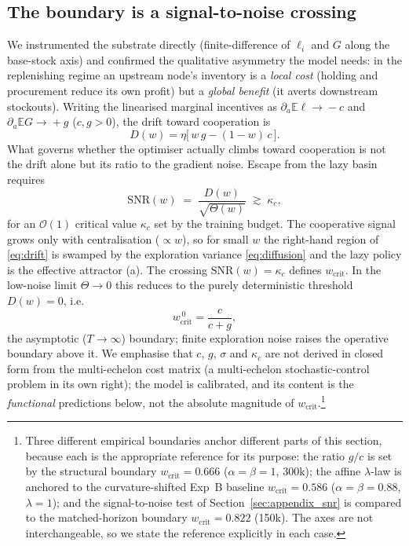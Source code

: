 \documentclass[letterpaper]{article}
\theoremstyle{plain}
\newcommand{\wcrit}{w_{\mathrm{crit}}}
\begin{document}
\subsection{The boundary is a signal-to-noise crossing}
We instrumented the substrate directly (finite-difference of $\ell_i$ and
$G$ along the base-stock axis) and confirmed the qualitative asymmetry the
model needs: in the replenishing regime an upstream node's inventory is a
\emph{local cost} (holding and procurement reduce its own profit) but a
\emph{global benefit} (it averts downstream stockouts). Writing the
linearised marginal incentives as $\partial_a\mathbb{E}\ell\!\to\!-c$ and
$\partial_a\mathbb{E}G\!\to\!+g$ ($c,g>0$), the drift toward cooperation is
\begin{equation}
  D(w)=\eta\big[\,w\,g-(1-w)\,c\,\big].
  \label{eq:drift}
\end{equation}
What governs whether the optimiser actually climbs toward cooperation is
not the drift alone but its ratio to the gradient noise. Escape from the
lazy basin requires
\begin{equation}
  \mathrm{SNR}(w)\;=\;\frac{D(w)}{\sqrt{\Theta(w)}}\;\gtrsim\;\kappa_c ,
  \label{eq:snr}
\end{equation}
for an $\mathcal{O}(1)$ critical value $\kappa_c$ set by the training
budget. The cooperative signal grows only with centralisation
($\propto w$), so for small $w$ the right-hand region of \eqref{eq:drift}
is swamped by the exploration variance \eqref{eq:diffusion} and the lazy
policy is the effective attractor (a). The crossing
$\mathrm{SNR}(w)=\kappa_c$ defines $\wcrit$. In the low-noise limit
$\Theta\!\to\!0$ this reduces to the purely deterministic threshold
$D(w)=0$, i.e.
\begin{equation}
  \wcrit^{\,0}=\frac{c}{c+g},
  \label{eq:wcrit}
\end{equation}
the asymptotic ($T\!\to\!\infty$) boundary; finite exploration noise raises
the operative boundary above it. We emphasise that $c$, $g$, $\sigma$ and
$\kappa_c$ are not derived in closed form from the multi-echelon cost
matrix (a multi-echelon stochastic-control problem in its own right); the
model is calibrated, and its content is the \emph{functional} predictions
below, not the absolute magnitude of $\wcrit$.\footnote{%
  Three different empirical boundaries anchor different parts of this
  section, because each is the appropriate reference for its purpose: the
  ratio $g/c$ is set by the structural boundary $\wcrit{=}0.666$
  ($\alpha{=}\beta{=}1$, 300k); the affine $\lambda$-law is anchored to the
  curvature-shifted Exp~B baseline $\wcrit{=}0.586$ ($\alpha{=}\beta{=}0.88$,
  $\lambda{=}1$); and the signal-to-noise test of Section~\ref{sec:appendix_snr}
  is compared to the matched-horizon boundary $\wcrit{=}0.822$ (150k). The
  axes are not interchangeable, so we state the reference explicitly in each
  case.}
\end{document}
